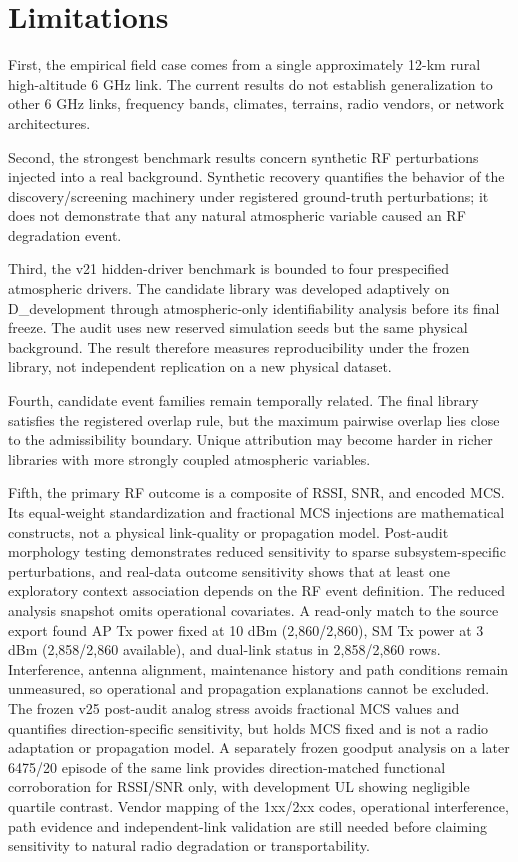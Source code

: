 \documentclass{ieeeaccess}
\begin{document}
\section{Limitations}\label{limitations}

First, the empirical field case comes from a single approximately 12-km rural high-altitude 6 GHz link. The current results do not establish generalization to other 6 GHz links, frequency bands, climates, terrains, radio vendors, or network architectures.

Second, the strongest benchmark results concern synthetic RF perturbations injected into a real background. Synthetic recovery quantifies the behavior of the discovery/screening machinery under registered ground-truth perturbations; it does not demonstrate that any natural atmospheric variable caused an RF degradation event.

Third, the v21 hidden-driver benchmark is bounded to four prespecified atmospheric drivers. The candidate library was developed adaptively on D\_development through atmospheric-only identifiability analysis before its final freeze. The audit uses new reserved simulation seeds but the same physical background. The result therefore measures reproducibility under the frozen library, not independent replication on a new physical dataset.

Fourth, candidate event families remain temporally related. The final library satisfies the registered overlap rule, but the maximum pairwise overlap lies close to the admissibility boundary. Unique attribution may become harder in richer libraries with more strongly coupled atmospheric variables.

Fifth, the primary RF outcome is a composite of RSSI, SNR, and encoded MCS. Its equal-weight standardization and fractional MCS injections are mathematical constructs, not a physical link-quality or propagation model. Post-audit morphology testing demonstrates reduced sensitivity to sparse subsystem-specific perturbations, and real-data outcome sensitivity shows that at least one exploratory context association depends on the RF event definition. The reduced analysis snapshot omits operational covariates. A read-only match to the source export found AP Tx power fixed at 10 dBm (2,860/2,860), SM Tx power at 3 dBm (2,858/2,860 available), and dual-link status in 2,858/2,860 rows. Interference, antenna alignment, maintenance history and path conditions remain unmeasured, so operational and propagation explanations cannot be excluded. The frozen v25 post-audit analog stress avoids fractional MCS values and quantifies direction-specific sensitivity, but holds MCS fixed and is not a radio adaptation or propagation model. A separately frozen goodput analysis on a later 6475/20 episode of the same link provides direction-matched functional corroboration for RSSI/SNR only, with development UL showing negligible quartile contrast. Vendor mapping of the 1xx/2xx codes, operational interference, path evidence and independent-link validation are still needed before claiming sensitivity to natural radio degradation or transportability.
\end{document}
